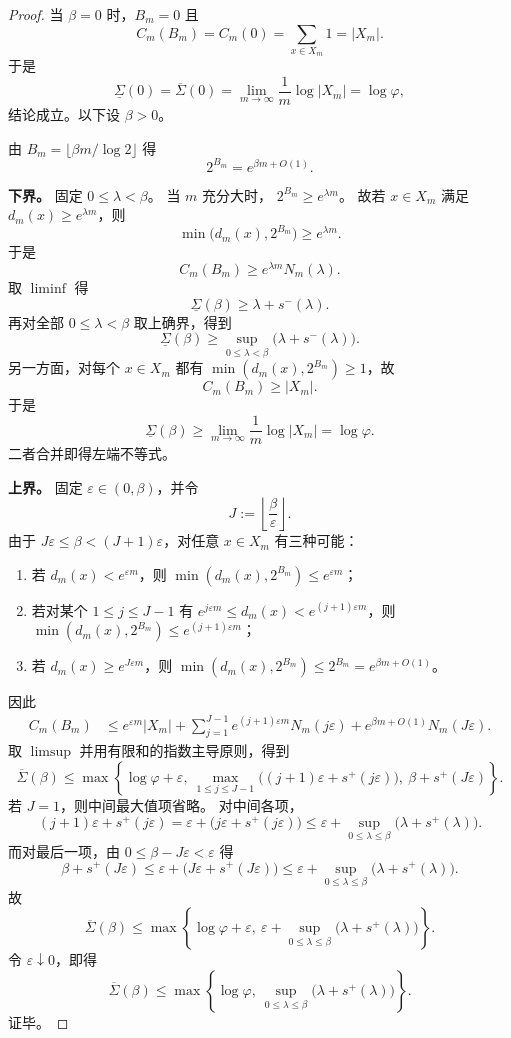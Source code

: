 \begin{proof}
当 \(\beta=0\) 时，\(B_m=0\) 且
\[
C_m(B_m)=C_m(0)=\sum_{x\in X_m}1=|X_m|.
\]
于是
\[
\underline\Sigma(0)=\overline\Sigma(0)
=
\lim_{m\to\infty}\frac1m\log|X_m|
=
\log\varphi,
\]
结论成立。以下设 \(\beta>0\)。
\par
由
\(
B_m=\lfloor \beta m/\log 2\rfloor
\)
得
\[
2^{B_m}=e^{\beta m+O(1)}.
\]
\par
\textbf{下界。}
固定 \(0\le \lambda<\beta\)。
当 \(m\) 充分大时，
\(
2^{B_m}\ge e^{\lambda m}
\)。
故若 \(x\in X_m\) 满足 \(d_m(x)\ge e^{\lambda m}\)，则
\[
\min\bigl(d_m(x),2^{B_m}\bigr)\ge e^{\lambda m}.
\]
于是
\[
C_m(B_m)\ge e^{\lambda m}N_m(\lambda).
\]
取 \(\liminf\) 得
\[
\underline\Sigma(\beta)\ge \lambda+s^{-}(\lambda).
\]
再对全部 \(0\le \lambda<\beta\) 取上确界，得到
\[
\underline\Sigma(\beta)\ge \sup_{0\le \lambda<\beta}\bigl(\lambda+s^{-}(\lambda)\bigr).
\]
另一方面，对每个 \(x\in X_m\) 都有
\(
\min(d_m(x),2^{B_m})\ge 1
\)，故
\[
C_m(B_m)\ge |X_m|.
\]
于是
\[
\underline\Sigma(\beta)\ge
\lim_{m\to\infty}\frac1m\log|X_m|
=\log\varphi.
\]
二者合并即得左端不等式。
\par
\textbf{上界。}
固定 \(\varepsilon\in(0,\beta)\)，并令
\[
J:=\left\lfloor\frac{\beta}{\varepsilon}\right\rfloor.
\]
由于 \(J\varepsilon\le \beta<(J+1)\varepsilon\)，对任意 \(x\in X_m\) 有三种可能：
\begin{enumerate}
  \item 若 \(d_m(x)<e^{\varepsilon m}\)，则
  \(
  \min(d_m(x),2^{B_m})\le e^{\varepsilon m}
  \)；
  \item 若对某个 \(1\le j\le J-1\) 有
  \(
  e^{j\varepsilon m}\le d_m(x)<e^{(j+1)\varepsilon m}
  \)，则
  \(
  \min(d_m(x),2^{B_m})\le e^{(j+1)\varepsilon m}
  \)；
  \item 若 \(d_m(x)\ge e^{J\varepsilon m}\)，则
  \(
  \min(d_m(x),2^{B_m})\le 2^{B_m}=e^{\beta m+O(1)}
  \)。
\end{enumerate}
因此
\[
\begin{aligned}
C_m(B_m)
&\le
e^{\varepsilon m}|X_m|
+\sum_{j=1}^{J-1} e^{(j+1)\varepsilon m}N_m(j\varepsilon)
+e^{\beta m+O(1)}N_m(J\varepsilon).
\end{aligned}
\]
取 \(\limsup\) 并用有限和的指数主导原则，得到
\[
\overline\Sigma(\beta)
\le
\max\!\left\{
\log\varphi+\varepsilon,\
\max_{1\le j\le J-1}\bigl((j+1)\varepsilon+s^{+}(j\varepsilon)\bigr),\
\beta+s^{+}(J\varepsilon)
\right\}.
\]
若 \(J=1\)，则中间最大值项省略。
对中间各项，
\[
(j+1)\varepsilon+s^{+}(j\varepsilon)
=
\varepsilon+\bigl(j\varepsilon+s^{+}(j\varepsilon)\bigr)
\le
\varepsilon+\sup_{0\le \lambda\le \beta}\bigl(\lambda+s^{+}(\lambda)\bigr).
\]
而对最后一项，由 \(0\le \beta-J\varepsilon<\varepsilon\) 得
\[
\beta+s^{+}(J\varepsilon)
\le
\varepsilon+\bigl(J\varepsilon+s^{+}(J\varepsilon)\bigr)
\le
\varepsilon+\sup_{0\le \lambda\le \beta}\bigl(\lambda+s^{+}(\lambda)\bigr).
\]
故
\[
\overline\Sigma(\beta)
\le
\max\!\left\{
\log\varphi+\varepsilon,\
\varepsilon+\sup_{0\le \lambda\le \beta}\bigl(\lambda+s^{+}(\lambda)\bigr)
\right\}.
\]
令 \(\varepsilon\downarrow 0\)，即得
\[
\overline\Sigma(\beta)
\le
\max\!\left\{
\log\varphi,\
\sup_{0\le \lambda\le \beta}\bigl(\lambda+s^{+}(\lambda)\bigr)
\right\}.
\]
证毕。
\end{proof}

